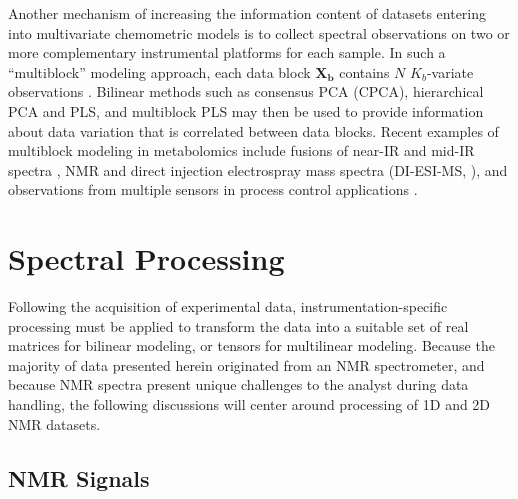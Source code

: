 \begin{doublespace}
Another mechanism of increasing the information content of datasets entering
into multivariate chemometric models is to collect spectral observations on
two or more complementary instrumental platforms for each sample. In such a
``multiblock'' modeling approach, each data block $\mathbf{X_b}$ contains $N$
$K_b$-variate observations \cite{westerhuis:jchemo1998,smilde:jchemo2003}.
Bilinear methods such as consensus PCA (CPCA), hierarchical PCA and PLS, and
multiblock PLS may then be used to provide information about data variation
that is correlated between data blocks. Recent examples of multiblock modeling
in metabolomics include fusions of near-IR and mid-IR spectra
\cite{bras:cils2005}, \hnmr{} NMR and direct injection electrospray mass
spectra (DI-ESI-MS, \cite{marshall:metab2015}), and observations from multiple
sensors in process control applications \cite{ferreira:jchemo2010}.
\end{doublespace}

\section{Spectral Processing}

\begin{doublespace}
Following the acquisition of experimental data, instrumentation-specific
processing must be applied to transform the data into a suitable set of
real matrices for bilinear modeling, or tensors for multilinear modeling.
Because the majority of data presented herein originated from an NMR
spectrometer, and because NMR spectra present unique challenges to the
analyst during data handling, the following discussions will center around
processing of 1D and 2D NMR datasets.
\end{doublespace}

\subsection{NMR Signals}

